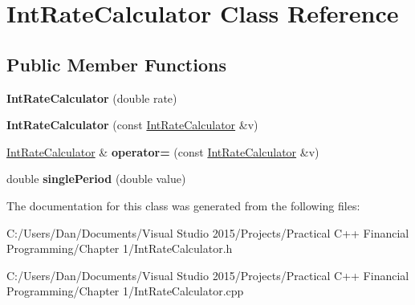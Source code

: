 \hypertarget{class_int_rate_calculator}{}\section{Int\+Rate\+Calculator Class Reference}
\label{class_int_rate_calculator}
\subsection*{Public Member Functions}
\begin{DoxyCompactItemize}
\item 
\hypertarget{class_int_rate_calculator_ad6bff71877a8f08f344bef00368806bb}{}\label{class_int_rate_calculator_ad6bff71877a8f08f344bef00368806bb} 
{\bfseries Int\+Rate\+Calculator} (double rate)
\item 
\hypertarget{class_int_rate_calculator_a30fc2b156fae63c2714b5f92e92e3eb5}{}\label{class_int_rate_calculator_a30fc2b156fae63c2714b5f92e92e3eb5} 
{\bfseries Int\+Rate\+Calculator} (const \hyperlink{class_int_rate_calculator}{Int\+Rate\+Calculator} \&v)
\item 
\hypertarget{class_int_rate_calculator_ac1d2ee48d79c878ad2df1e96ad45980f}{}\label{class_int_rate_calculator_ac1d2ee48d79c878ad2df1e96ad45980f} 
\hyperlink{class_int_rate_calculator}{Int\+Rate\+Calculator} \& {\bfseries operator=} (const \hyperlink{class_int_rate_calculator}{Int\+Rate\+Calculator} \&v)
\item 
\hypertarget{class_int_rate_calculator_aa36c565312d7b82cb3ac95d1a6856987}{}\label{class_int_rate_calculator_aa36c565312d7b82cb3ac95d1a6856987} 
double {\bfseries single\+Period} (double value)
\end{DoxyCompactItemize}


The documentation for this class was generated from the following files\+:\begin{DoxyCompactItemize}
\item 
C\+:/\+Users/\+Dan/\+Documents/\+Visual Studio 2015/\+Projects/\+Practical C++ Financial Programming/\+Chapter 1/Int\+Rate\+Calculator.\+h\item 
C\+:/\+Users/\+Dan/\+Documents/\+Visual Studio 2015/\+Projects/\+Practical C++ Financial Programming/\+Chapter 1/Int\+Rate\+Calculator.\+cpp\end{DoxyCompactItemize}
